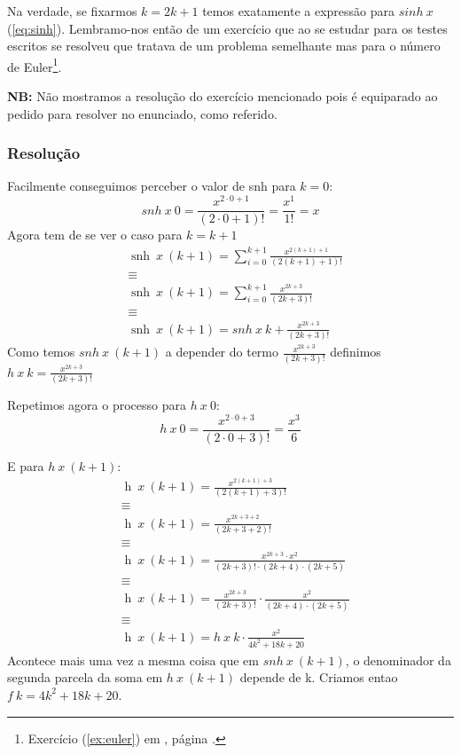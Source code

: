\documentclass[11pt, a4paper, fleqn]{article}
\DeclareMathOperator{\snh}{snh}
\DeclareMathOperator{\h}{h}
\begin{document}
Na verdade, se fixarmos $k = 2k + 1$ temos exatamente a expressão para $sinh\ x$ (\ref{eq:sinh}). Lembramo-nos então de um exercício que ao se estudar para os testes escritos
se resolveu que tratava de um problema semelhante mas para o número de Euler\footnote{Exercício (\ref{ex:euler}) em \cite{Ol18}, página \pageref{ex:euler}.}.

\noindent
\textbf{NB:} Não mostramos a resolução do exercício mencionado pois é equiparado ao pedido para resolver no enunciado, como referido.

\subsubsection*{Resolução}

Facilmente conseguimos perceber o valor de snh para $k = 0$:
\[
    snh\ x\ 0 = \frac{x^{2 \cdot 0 + 1 }}{(2 \cdot 0 + 1)!} = \frac{x^1}{1!} = x
\]
\noindent
Agora tem de se ver o caso para $k = k + 1$
\[
\begin{split}
    &\snh\ x\ (k + 1) = \sum_{i=0}^{k+1} \frac{x^{2(k + 1) + 1}}{(2(k + 1) + 1)!} \\
    &\equiv \\
    &\snh\ x\ (k + 1) = \sum_{i=0}^{k+1} \frac{x^{2k + 3}}{(2k + 3)!} \\
    &\equiv \\
    &\snh\ x\ (k + 1) = snh\ x\ k + \frac{x^{2k + 3}}{(2k + 3)!}
\end{split} 
\]
\noindent
Como temos $snh\ x\ (k+1)$ a depender do termo $\frac{x^{2k + 3}}{(2k + 3)!}$ definimos $h\ x\ k = \frac{x^{2k + 3}}{(2k + 3)!}$

Repetimos agora o processo para $h\ x\ 0$:
\[
    h\ x\ 0 = \frac{x^{2 \cdot 0 + 3}}{(2 \cdot 0 + 3)!} = \frac{x^3}{6}
\]

E para $h\ x\ (k+1)$:
\[
\begin{split}
    &\h\ x\ (k + 1) = \frac{x^{2(k + 1) + 3}}{(2(k + 1) + 3)!} \\
    &\equiv \\
    &\h\ x\ (k + 1) = \frac{x^{2k + 3 + 2}}{(2k + 3 + 2)!} \\
    &\equiv \\
    &\h\ x\ (k + 1) = \frac{x^{2k + 3} \cdot x^{2}}{(2k + 3)! \cdot (2k + 4) \cdot (2k + 5)} \\
    &\equiv \\
    &\h\ x\ (k + 1) = \frac{x^{2k + 3}}{(2k + 3)!} \cdot \frac{x^{2}}{(2k + 4) \cdot (2k + 5)} \\
    &\equiv \\
    &\h\ x\ (k + 1) = h\ x\ k \cdot \frac{x^{2}}{4k^{2} + 18k + 20}
\end{split} 
\]
\noindent
Acontece mais uma vez a mesma coisa que em $snh\ x\ (k+1)$, o denominador da segunda parcela da soma em $h\ x\ (k+1)$ depende de k. 
Criamos entao $f\ k = 4k^{2} + 18k + 20$.
\end{document}
